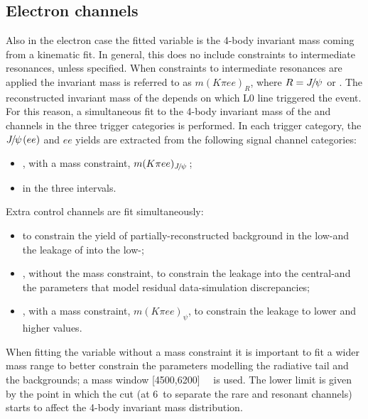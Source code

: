 \clearpage

\subsection{Electron channels}
\label{sec:RKst_fit_ee}

Also in the electron case the fitted variable is the 4-body invariant mass coming from a kinematic fit.
In general, this does no include constraints to intermediate resonances, unless specified.
When constraints to intermediate resonances are applied the invariant mass is referred to as
$m(K\pi ee)_R$, where $R = \jpsi$ or \psitwos.
The reconstructed invariant mass of the \Bz depends on which L0 line triggered the event.
For this reason, a simultaneous fit to the 4-body invariant mass of the \BdToKstJPsee and \BdToKstee 
channels in the three trigger categories is performed.
%
In each trigger category, the $\jpsi(ee)$ and $ee$ yields are extracted from the following signal channel categories:
%
\begin{itemize}
\item \BdToKstJPsee, with a \jpsi mass constraint, $m(K\pi ee)_{\jpsi}$;
\item \BdToKstee in the three \qsq intervals.
\end{itemize}

Extra control channels are fit simultaneously:
%
\begin{itemize}
\item \BdToKstGee to constrain the yield of partially-reconstructed background 
in the low-\qsq and the leakage of \BdToKstG into the low-\qsq;
\item \BdToKstJPsee, without the \jpsi mass constraint, to constrain the leakage into the central-\qsq and the 
parameters that model residual data-simulation discrepancies;
\item \BdToKstPsiee, with a \psitwos mass constraint,  $m(K\pi ee)_{\psi}$, to constrain the leakage to lower and higher \qsq values.
\end{itemize}

When fitting the variable without a \jpsi mass constraint it is important to fit a wider mass range to better constrain the 
parameters modelling the radiative tail and the backgrounds; a mass window [4500,6200]~\mevcc~ is used. The lower limit 
is given by the point in which the \qsq cut (at 6~\gevgevcccc to separate the rare and resonant channels)
starts to affect the 4-body invariant mass distribution. 
%
%

